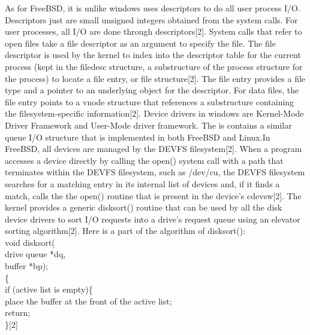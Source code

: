 \documentclass[10pt,draftclsnofoot,peerreview,letterpaper,onecolumn,]{IEEEtran}
\begin{document}
As for FreeBSD, it is unlike windows uses descriptors to do all user process I/O. Descriptors just are small unsigned integers obtained from the system calls. For user processes, all I/O are done through descriptors[2]. System calls that refer to open files take a file descriptor as an argument to specify the file. The file descriptor is used by the kernel to index into the descriptor table for the current process (kept in the filedesc structure, a substructure of the process structure for the process) to locate a file entry, or file structure[2]. The file entry provides a file type and a pointer to an underlying object for the descriptor. For data files, the file entry points to a vnode structure that references a substructure containing the filesystem-specific information[2]. Device drivers in windows are Kernel-Mode Driver Framework and User-Mode driver framework. The is contains a similar queue I/O structure that is implemented in both FreeBSD and Linux.In FreeBSD, all devices are managed by the DEVFS filesystem[2]. When a program accesses a device directly by calling the open() system call with a path that terminates within the DEVFS filesystem, such as /dev/cu, the DEVFS filesystem searches for a matching entry in its internal list of devices and, if it finds a match, calls the the open() routine that is present in the device’s cdevsw[2]. The kernel provides a generic disksort() routine that can be used by all the disk device drivers to sort I/O requests into a drive’s request queue using an elevator sorting algorithm[2].
Here is a part of the algorithm of disksort():
~\\void disksort(
~\\drive queue *dq,
~\\buffer *bp);
~\\\{
~\\if (active list is empty)\{
~\\place the buffer at the front of the active list;
~\\return;
~\\\}[2]
\end{document}
